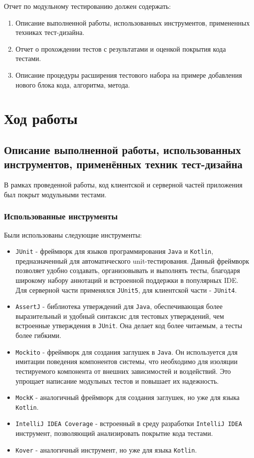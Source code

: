 \documentclass[a4paper, 14pt]{article}
\begin{document}
Отчет по модульному тестированию должен содержать:

\begin{enumerate}
    \item Описание выполненной работы, использованных инструментов, примененных техниках тест-дизайна.
    \item Отчет о прохождении тестов с результатами и оценкой покрытия кода тестами.
    \item Описание процедуры расширения тестового набора на примере добавления нового блока кода, алгоритма, метода.
\end{enumerate}

\section{Ход работы}

\subsection{Описание выполненной работы, использованных инструментов,
применённых техник тест-дизайна}

В рамках проведенной работы, код клиентской и серверной частей приложения был покрыт модульными тестами.

\subsubsection{Использованные инструменты}

Были использованы следующие инструменты:

\begin{itemize}
    \item \texttt{JUnit} - фреймворк для языков программирования \texttt{Java} и \texttt{Kotlin}, предназначенный для автоматического unit-тестирования. Данный фреймворк позволяет удобно создавать, организовывать и выполнять тесты, благодаря широкому набору аннотаций и встроенной поддержки в популярных IDE. Для серверной части применялся \texttt{JUnit5}, для клиентской части - \texttt{JUnit4}.
    \item \texttt{AssertJ} - библиотека утверждений для \texttt{Java}, обеспечивающая более выразительный и удобный синтаксис для тестовых утверждений, чем встроенные утверждения в \texttt{JUnit}. Она делает код более читаемым, а тесты более гибкими.
    \item \texttt{Mockito} - фреймворк для создания заглушек в \texttt{Java}. Он используется для имитации поведения компонентов системы, что необходимо для изоляции тестируемого компонента от внешних зависимостей и воздействий. Это упрощает написание модульных тестов и повышает их надежность.
    \item \texttt{MockK} - аналогичный фреймворк для создания заглушек, но уже для языка \texttt{Kotlin}.
    \item \texttt{IntelliJ IDEA Coverage} - встроенный в среду разработки \texttt{IntelliJ IDEA} инструмент, позволяющий анализировать покрытие кода тестами.
    \item \texttt{Kover} - аналогичный инструмент, но уже для языка \texttt{Kotlin}.
\end{itemize}
\end{document}
